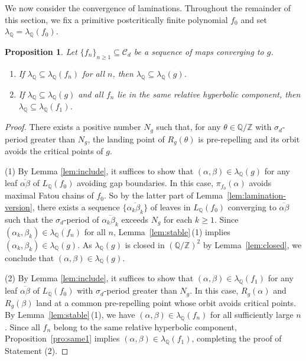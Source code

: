 \documentclass[a4paper,reqno,times, 11pt]{amsart}
\newtheorem{proposition}[theorem]{Proposition}
\theoremstyle{remark}
\theoremstyle{plain}
\numberwithin{equation}{section}
\def\CCCC{\mathscr C}
\def\Q{\mathbb Q}
\def\Z{\mbox{$\mathbb Z$}}
\begin{document}
	We now consider the convergence of laminations.	
	Throughout the remainder of this section, we fix a primitive postcritically finite polynomial $f_0$ and set $\lambda_{\Q}=\lambda_{\Q}(f_0)$.
	
	\begin{proposition}\label{pro:lami-convergence}
		Let $\{f_n\}_{n\geq1}\subseteq \CCCC_d$ be a sequence of maps converging to $g$.
		\begin{enumerate}
			\item If $\lambda_\Q\subseteq \lambda_\Q(f_n)$ for all $n$, then $\lambda_\Q\subseteq\lambda_\Q(g)$.
			\item If $\lambda_\Q\subseteq \lambda_\Q(g)$ and all $f_n$ lie in the same relative hyperbolic component, then $\lambda_\Q\subseteq \lambda_\Q(f_1)$.
		\end{enumerate}
	\end{proposition}
	\begin{proof}
		There exists a positive number $N_g$ such that, for any $\theta \in \mathbb{Q}/\mathbb{Z}$ with $\sigma_d$-period greater than $N_g$, the landing point of $R_g(\theta)$ is pre-repelling and its orbit avoids the critical points of $g$.
		
		(1) By Lemma \ref{lem:include}, it suffices to show that $(\alpha,\beta) \in \lambda_\mathbb{Q}(g)$ for any leaf $\overline{\alpha\beta}$ of $L_\mathbb{Q}(f_0)$ avoiding gap boundaries. In this case, $\pi_{f_0}(\alpha)$ avoids maximal Fatou chains of $f_0$.
So by the latter part of Lemma~\ref{lem:lamination-version}, there exists a sequence $\{\overline{\alpha_k\beta_k}\}$ of leaves in $L_\mathbb{Q}(f_0)$ converging to $\overline{\alpha\beta}$ such that the $\sigma_d$-period of $\overline{\alpha_k\beta_k}$ exceeds $N_g$ for each $k\geq1$.
		Since $(\alpha_k,\beta_k)\in \lambda_\mathbb{Q}(f_n)$ for all $n$, Lemma~\ref{lem:stable}\,(1) implies $(\alpha_k,\beta_k) \in \lambda_\mathbb{Q}(g)$. As $\lambda_\Q(g)$ is closed in $(\Q/\Z)^2$ by Lemma~\ref{lem:closed}, we conclude that $(\alpha,\beta) \in \lambda_\mathbb{Q}(g)$.\vspace{3pt}
		
		(2) By Lemma \ref{lem:include}, it suffices to show that $(\alpha,\beta) \in \lambda_\mathbb{Q}(f_{1})$ for any leaf $\overline{\alpha\beta}$ of $L_\mathbb{Q}(f_0)$ with $\sigma_d$-period greater than $N_g$.
		In this case, $R_g(\alpha)$ and $R_g(\beta)$ land at a common pre-repelling point whose orbit avoids critical points. By Lemma~\ref{lem:stable}\,(1), we have $(\alpha,\beta) \in \lambda_\mathbb{Q}(f_n)$ for all sufficiently large $n$. Since all $f_n$ belong to the same relative hyperbolic component, Proposition~\ref{pro:same1} implies $(\alpha,\beta) \in \lambda_\mathbb{Q}(f_{1})$, completing the proof of Statement (2).
	\end{proof}
	
\end{document}
